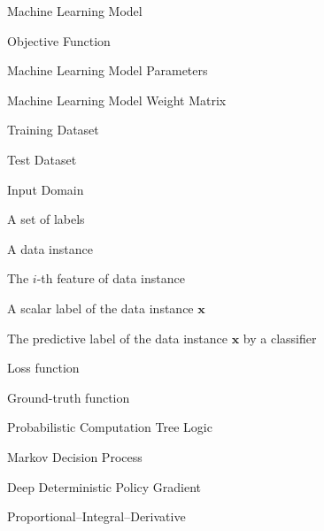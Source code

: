 %
%





 Machine Learning Model

 Objective Function

\runinhead{$\theta$} Machine Learning Model Parameters

 Machine Learning Model Weight Matrix

 Training Dataset

 Test Dataset

 Input Domain

 A set of labels

 A data instance 

 The $i$-th feature of data instance 

 A scalar label of the data instance $\textbf{x}$ 

 The predictive label of the data instance $\textbf{x}$ by a classifier


 Loss function 

 Ground-truth function 

 Probabilistic Computation Tree Logic

 Markov Decision Process

 Deep Deterministic Policy Gradient

 Proportional–Integral–Derivative




